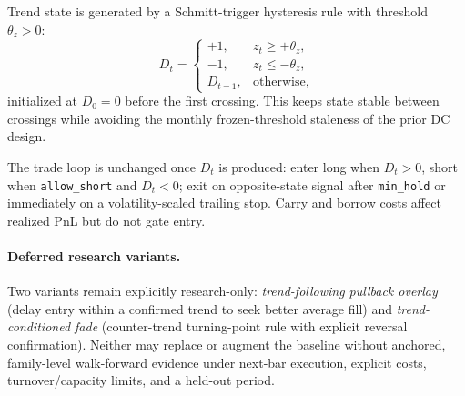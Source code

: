 Trend state is generated by a Schmitt-trigger hysteresis rule with threshold
$\theta_z>0$:
\begin{equation}
D_t=
\begin{cases}
+1, & z_t \ge +\theta_z, \\
-1, & z_t \le -\theta_z, \\
D_{t-1}, & \text{otherwise},
\end{cases}
\end{equation}
initialized at $D_0=0$ before the first crossing. This keeps state stable between
crossings while avoiding the monthly frozen-threshold staleness of the prior DC
design.

The trade loop is unchanged once $D_t$ is produced: enter long when $D_t>0$, short
when \texttt{allow\_short} and $D_t<0$; exit on opposite-state signal after
\texttt{min\_hold} or immediately on a volatility-scaled trailing stop. Carry and
borrow costs affect realized PnL but do not gate entry.

\paragraph{Deferred research variants.} Two variants remain explicitly research-only:
\emph{trend-following pullback overlay} (delay entry within a confirmed trend to seek
better average fill) and \emph{trend-conditioned fade} (counter-trend turning-point
rule with explicit reversal confirmation). Neither may replace or augment the baseline
without anchored, family-level walk-forward evidence under next-bar execution,
explicit costs, turnover/capacity limits, and a held-out period.

